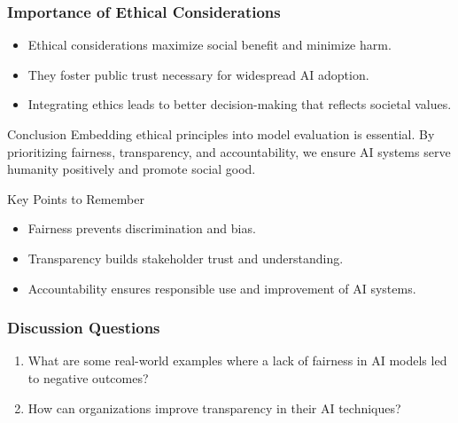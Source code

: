 \documentclass[aspectratio=169]{beamer}
\begin{document}
\begin{frame}[fragile]
  \frametitle{Importance of Ethical Considerations}
  \begin{itemize}
    \item Ethical considerations maximize social benefit and minimize harm.
    \item They foster public trust necessary for widespread AI adoption.
    \item Integrating ethics leads to better decision-making that reflects societal values.
  \end{itemize}

  \begin{block}{Conclusion}
    Embedding ethical principles into model evaluation is essential. By prioritizing fairness, transparency, and accountability, we ensure AI systems serve humanity positively and promote social good.
  \end{block}
  
  \begin{block}{Key Points to Remember}
    \begin{itemize}
      \item Fairness prevents discrimination and bias.
      \item Transparency builds stakeholder trust and understanding.
      \item Accountability ensures responsible use and improvement of AI systems.
    \end{itemize}
  \end{block}
\end{frame}

\begin{frame}[fragile]
  \frametitle{Discussion Questions}
  \begin{enumerate}
    \item What are some real-world examples where a lack of fairness in AI models led to negative outcomes?
    \item How can organizations improve transparency in their AI techniques?
  \end{enumerate}
\end{frame}
\end{document}
